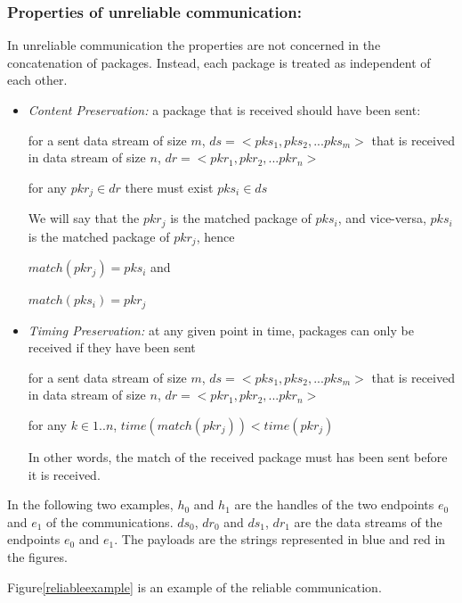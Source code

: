 \subsubsection{Properties of unreliable communication:}\label{unreliablepro}
In unreliable communication the properties are not concerned in the concatenation of packages. Instead, each package is treated as independent of each other.
\begin{itemize}
 \item \textit{ Content Preservation:} a package that is received should have been sent:

for a sent data stream of size $m$, $ds= <pks_1, pks_2, ... pks_m>$ that is received in data stream of size $n$, $dr = <pkr_1, pkr_2, ... pkr_n>$

for any $pkr_j \in dr$ there must exist $pks_i \in ds$

We will say that the $pkr_j$ is the matched package of $pks_i$, and vice-versa, $pks_i$ is the matched package of $pkr_j$, hence

$match(pkr_j) = pks_i$  and

$match(pks_i) = pkr_j$

 \item \textit{Timing Preservation:}  at any given point in time, packages can only be received if they have been sent

  for a sent data stream of size $m$, $ds= <pks_1, pks_2, ... pks_m>$ that is received in data stream of size $n$, $dr = <pkr_1, pkr_2, ... pkr_n>$

  for any $k \in {1..n}$, $time(match(pkr_j)) < time(pkr_j)$

In other words, the match of the received package must has been sent before it is received.

\end{itemize}


In the following two examples, $h_0$ and $h_1$ are the handles of the two endpoints $e_0$ and $e_1$ of the communications. $ds_0$, $dr_0$ and $ds_1$, $dr_1$ are the data streams of the endpoints $e_0$ and $e_1$. The payloads are the strings represented in blue and red in the figures. 

Figure\ref{reliableexample} is an example of the reliable communication. 

